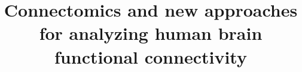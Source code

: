 \documentclass{bmcart}
\begin{document}
\begin{frontmatter}

\begin{fmbox}


\title{Connectomics and new approaches for analyzing human brain functional connectivity}

\author[
   addressref={aff1,aff2},
   corref={aff1},
   email={ccraddock@nki.rfmh.org}
]{  }
\author[
   addressref={aff1},                   %
   email={rosalia.tungaraza@childmind.org}   %
]{  }
\author[
   addressref={aff1,aff2}, 
   email={michael.milham@childmind.org}
]{  }


\address[id=aff1]{%
  , %
  ,                     %
  ,                              %
  ,
}
\address[id=aff2]{%
  , %
  ,                     %
  ,                              %
  ,
}



\end{fmbox}
\end{frontmatter}
\end{document}
